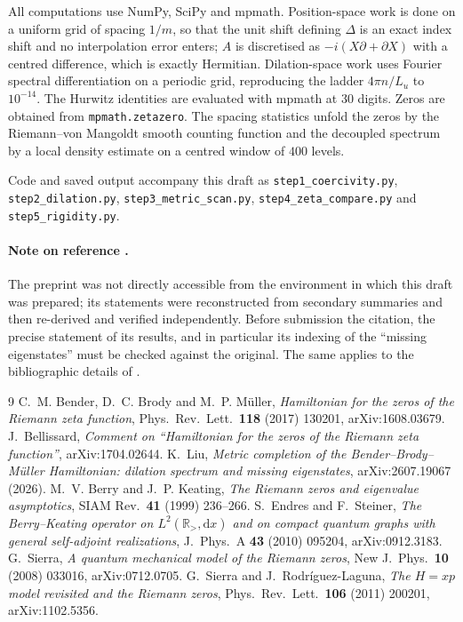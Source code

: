 \documentclass[11pt,a4paper]{article}
\theoremstyle{remark}
\newcommand{\R}{\mathbb{R}}
\newcommand{\dd}{\mathrm{d}}
\begin{document}
All computations use NumPy, SciPy and mpmath. Position-space work is done on a uniform grid of
spacing $1/m$, so that the unit shift defining $\Delta$ is an exact index shift and no
interpolation error enters; $A$ is discretised as $-i(X\partial+\partial X)$ with a centred
difference, which is exactly Hermitian. Dilation-space work uses Fourier spectral differentiation
on a periodic grid, reproducing the ladder $4\pi n/L_u$ to $10^{-14}$. The Hurwitz identities are
evaluated with mpmath at 30 digits. Zeros are obtained from \texttt{mpmath.zetazero}. The spacing
statistics unfold the zeros by the Riemann--von Mangoldt smooth counting function and the decoupled
spectrum by a local density estimate on a centred window of $400$ levels.

Code and saved output accompany this draft as \texttt{step1\_coercivity.py},
\texttt{step2\_dilation.py}, \texttt{step3\_metric\_scan.py}, \texttt{step4\_zeta\_compare.py} and
\texttt{step5\_rigidity.py}.

\paragraph{Note on reference \cite{Liu2026}.} The preprint was not directly accessible from the
environment in which this draft was prepared; its statements were reconstructed from secondary
summaries and then re-derived and verified independently. Before submission the citation, the
precise statement of its results, and in particular its indexing of the ``missing eigenstates''
must be checked against the original. The same applies to the bibliographic details of
\cite{Sierra2011}.

\begin{thebibliography}{9}
 C.~M. Bender, D.~C. Brody and M.~P. M\"uller,
\emph{Hamiltonian for the zeros of the Riemann zeta function},
Phys.\ Rev.\ Lett.\ \textbf{118} (2017) 130201, arXiv:1608.03679.
 J.~Bellissard,
\emph{Comment on ``Hamiltonian for the zeros of the Riemann zeta function''},
arXiv:1704.02644.
 K.~Liu,
\emph{Metric completion of the Bender--Brody--M\"uller Hamiltonian: dilation spectrum and missing
eigenstates}, arXiv:2607.19067 (2026).
 M.~V. Berry and J.~P. Keating,
\emph{The Riemann zeros and eigenvalue asymptotics},
SIAM Rev.\ \textbf{41} (1999) 236--266.
 S.~Endres and F.~Steiner,
\emph{The Berry--Keating operator on $L^2(\R_>,\dd x)$ and on compact quantum graphs with general
self-adjoint realizations}, J.\ Phys.\ A \textbf{43} (2010) 095204, arXiv:0912.3183.
 G.~Sierra,
\emph{A quantum mechanical model of the Riemann zeros},
New J.\ Phys.\ \textbf{10} (2008) 033016, arXiv:0712.0705.
 G.~Sierra and J.~Rodr\'iguez-Laguna,
\emph{The $H=xp$ model revisited and the Riemann zeros},
Phys.\ Rev.\ Lett.\ \textbf{106} (2011) 200201, arXiv:1102.5356.
\end{thebibliography}
\end{document}
